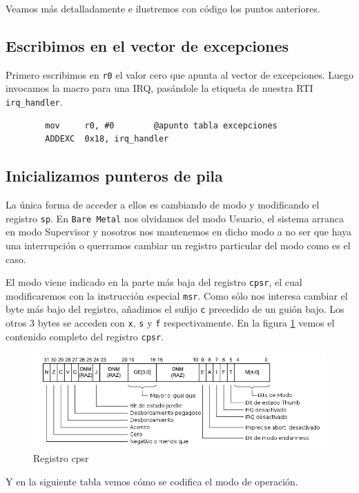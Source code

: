 Veamos más detalladamente e ilustremos con código los puntos anteriores.

\subsection{Escribimos en el vector de excepciones}

  Primero escribimos en {\tt r0} el valor cero que apunta al vector de excepciones.
  Luego invocamos la macro para una IRQ, pasándole la etiqueta de nuestra RTI {\tt irq_handler}.
\begin{lstlisting}
        mov     r0, #0        @apunto tabla excepciones
        ADDEXC  0x18, irq_handler
\end{lstlisting}

\subsection{Inicializamos punteros de pila}

La única forma de acceder a ellos es cambiando de modo y modificando el registro {\tt sp}. En
{\tt Bare Metal} nos olvidamos del modo Usuario, el sistema arranca en modo Supervisor y
nosotros nos mantenemos en dicho modo a no ser que haya una interrupción o querramos cambiar
un registro particular del modo como es el caso.

El modo viene indicado en la parte más baja del registro {\tt cpsr}, el cual modificaremos
con la instrucción especial {\tt msr}. Como sólo nos interesa cambiar el byte más bajo del
registro, añadimos el sufijo {\tt c} precedido de un guión bajo. Los otros 3 bytes se acceden
con {\tt x}, {\tt s} y {\tt f} respectivamente. En la figura \ref{fig:cpsr} vemos el contenido
completo del registro {\tt cpsr}.

\begin{figure}[h]
  \centering
    \includegraphics[width=14cm]{graphs/cpsr.png}
  \caption{Registro cpsr}
  \label{fig:cpsr}
\end{figure}

Y en la siguiente tabla vemos cómo se codifica el modo de operación.


